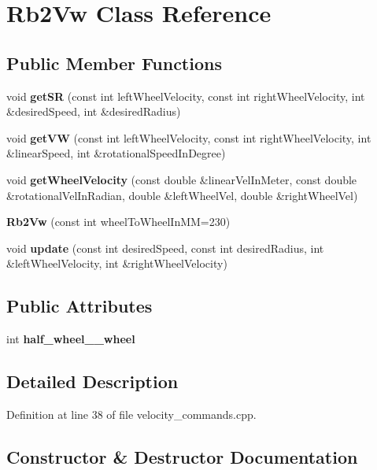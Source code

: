 \section{\-Rb2\-Vw \-Class \-Reference}
\label{classRb2Vw}
\subsection*{\-Public \-Member \-Functions}
\begin{DoxyCompactItemize}
\item 
void {\bf get\-S\-R} (const int left\-Wheel\-Velocity, const int right\-Wheel\-Velocity, int \&desired\-Speed, int \&desired\-Radius)
\item 
void {\bf get\-V\-W} (const int left\-Wheel\-Velocity, const int right\-Wheel\-Velocity, int \&linear\-Speed, int \&rotational\-Speed\-In\-Degree)
\item 
void {\bf get\-Wheel\-Velocity} (const double \&linear\-Vel\-In\-Meter, const double \&rotational\-Vel\-In\-Radian, double \&left\-Wheel\-Vel, double \&right\-Wheel\-Vel)
\item 
{\bf \-Rb2\-Vw} (const int wheel\-To\-Wheel\-In\-M\-M=230)
\item 
void {\bf update} (const int desired\-Speed, const int desired\-Radius, int \&left\-Wheel\-Velocity, int \&right\-Wheel\-Velocity)
\end{DoxyCompactItemize}
\subsection*{\-Public \-Attributes}
\begin{DoxyCompactItemize}
\item 
int {\bf half\-\_\-wheel\-\_\-\_\-wheel}
\end{DoxyCompactItemize}


\subsection{\-Detailed \-Description}


\-Definition at line 38 of file velocity\-\_\-commands.\-cpp.



\subsection{\-Constructor \& \-Destructor \-Documentation}
